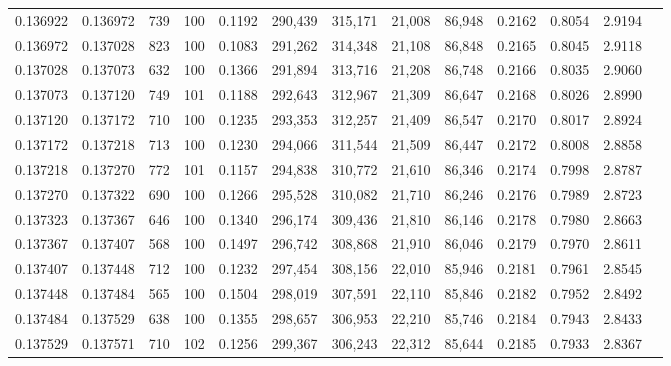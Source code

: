 \begin{tabular}{rrrrrrrrrrrrr}
0.136922 & 0.136972 &   739 & 100 &                                     0.1192 & 290,439 & 315,171 &  21,008 &  86,948 & 0.2162 & 0.8054 & 2.9194 \\
0.136972 & 0.137028 &   823 & 100 &                                     0.1083 & 291,262 & 314,348 &  21,108 &  86,848 & 0.2165 & 0.8045 & 2.9118 \\
0.137028 & 0.137073 &   632 & 100 &                                     0.1366 & 291,894 & 313,716 &  21,208 &  86,748 & 0.2166 & 0.8035 & 2.9060 \\
0.137073 & 0.137120 &   749 & 101 &                                     0.1188 & 292,643 & 312,967 &  21,309 &  86,647 & 0.2168 & 0.8026 & 2.8990 \\
0.137120 & 0.137172 &   710 & 100 &                                     0.1235 & 293,353 & 312,257 &  21,409 &  86,547 & 0.2170 & 0.8017 & 2.8924 \\
0.137172 & 0.137218 &   713 & 100 &                                     0.1230 & 294,066 & 311,544 &  21,509 &  86,447 & 0.2172 & 0.8008 & 2.8858 \\
0.137218 & 0.137270 &   772 & 101 &                                     0.1157 & 294,838 & 310,772 &  21,610 &  86,346 & 0.2174 & 0.7998 & 2.8787 \\
0.137270 & 0.137322 &   690 & 100 &                                     0.1266 & 295,528 & 310,082 &  21,710 &  86,246 & 0.2176 & 0.7989 & 2.8723 \\
0.137323 & 0.137367 &   646 & 100 &                                     0.1340 & 296,174 & 309,436 &  21,810 &  86,146 & 0.2178 & 0.7980 & 2.8663 \\
0.137367 & 0.137407 &   568 & 100 &                                     0.1497 & 296,742 & 308,868 &  21,910 &  86,046 & 0.2179 & 0.7970 & 2.8611 \\
0.137407 & 0.137448 &   712 & 100 &                                     0.1232 & 297,454 & 308,156 &  22,010 &  85,946 & 0.2181 & 0.7961 & 2.8545 \\
0.137448 & 0.137484 &   565 & 100 &                                     0.1504 & 298,019 & 307,591 &  22,110 &  85,846 & 0.2182 & 0.7952 & 2.8492 \\
0.137484 & 0.137529 &   638 & 100 &                                     0.1355 & 298,657 & 306,953 &  22,210 &  85,746 & 0.2184 & 0.7943 & 2.8433 \\
0.137529 & 0.137571 &   710 & 102 &                                     0.1256 & 299,367 & 306,243 &  22,312 &  85,644 & 0.2185 & 0.7933 & 2.8367 \\

\end{tabular}
